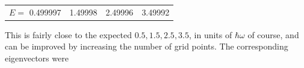 \documentclass[11pt]{article}
\begin{document}
\begin{enumerate}
    \begin{table}[H]
        \centering
        \begin{tabular}{c c c c}
            $E=$ 0.499997 & 1.49998 & 2.49996 & 3.49992
        \end{tabular}
    \end{table}

    This is fairly close to the expected $0.5, 1.5, 2.5, 3.5$, in units of $\hbar\omega$ of course, and can be improved by increasing the number of grid points. The corresponding eigenvectors were
    \begin{figure}[h]
        \begin{center}
        \end{center}
    \end{figure}
    


\end{enumerate}
\end{document}
